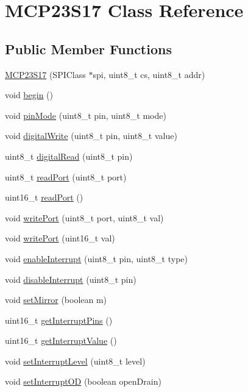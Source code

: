 \hypertarget{classMCP23S17}{\section{M\-C\-P23\-S17 Class Reference}
\label{classMCP23S17}
}
\subsection*{Public Member Functions}
\begin{DoxyCompactItemize}
\item 
\hyperlink{classMCP23S17_a97d5acfce335affc1fd0e90f27bb2773}{M\-C\-P23\-S17} (S\-P\-I\-Class $\ast$spi, uint8\-\_\-t cs, uint8\-\_\-t addr)
\item 
void \hyperlink{classMCP23S17_a406756f19493cdec55b56617ddc109f1}{begin} ()
\item 
void \hyperlink{classMCP23S17_a6e9078f8c0e9c623de2505ed4c19f09e}{pin\-Mode} (uint8\-\_\-t pin, uint8\-\_\-t mode)
\item 
void \hyperlink{classMCP23S17_a14834358725d440513946ac3d6c6a02e}{digital\-Write} (uint8\-\_\-t pin, uint8\-\_\-t value)
\item 
uint8\-\_\-t \hyperlink{classMCP23S17_a30386f1e0486570613ea06d110387093}{digital\-Read} (uint8\-\_\-t pin)
\item 
uint8\-\_\-t \hyperlink{classMCP23S17_aa798040d8c6b863398978623a73d6cba}{read\-Port} (uint8\-\_\-t port)
\item 
uint16\-\_\-t \hyperlink{classMCP23S17_a45d1747d85825e3bf2cf4be7268c9b92}{read\-Port} ()
\item 
void \hyperlink{classMCP23S17_ad11ed96faaef273362d2c54260e68891}{write\-Port} (uint8\-\_\-t port, uint8\-\_\-t val)
\item 
void \hyperlink{classMCP23S17_a63a34c5b29e75cfd715bd1449626f98e}{write\-Port} (uint16\-\_\-t val)
\item 
void \hyperlink{classMCP23S17_a8cfe7bd574736faeca00e133e5e19ec3}{enable\-Interrupt} (uint8\-\_\-t pin, uint8\-\_\-t type)
\item 
void \hyperlink{classMCP23S17_aff570e5211f9443769a53f017626b180}{disable\-Interrupt} (uint8\-\_\-t pin)
\item 
void \hyperlink{classMCP23S17_a5b9bcf0d06c5a15875f406e1ed73ecc7}{set\-Mirror} (boolean m)
\item 
uint16\-\_\-t \hyperlink{classMCP23S17_ad1a11133076a20b9c16e30fb2ddc566c}{get\-Interrupt\-Pins} ()
\item 
uint16\-\_\-t \hyperlink{classMCP23S17_adf3b48d655eb9850a9349973d0ece330}{get\-Interrupt\-Value} ()
\item 
void \hyperlink{classMCP23S17_a5786c6b9a618a1c7c0fd95ca7d93774d}{set\-Interrupt\-Level} (uint8\-\_\-t level)
\item 
void \hyperlink{classMCP23S17_aef7c2e4c24141e8ba455aa1d2e497e6c}{set\-Interrupt\-O\-D} (boolean open\-Drain)
\end{DoxyCompactItemize}


